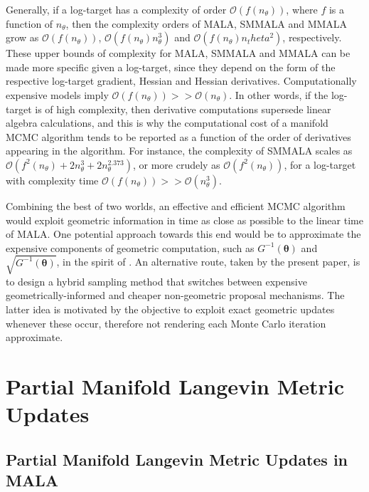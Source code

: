 \documentclass[twoside,11pt]{article}
\begin{document}
Generally, if a log-target has a complexity of order $\mathcal{O}(f(n_{\theta}))$, where $f$ is a function of $n_{\theta}$, 
then the complexity orders of MALA, SMMALA and MMALA grow as $\mathcal{O}(f(n_{\theta}))$, $\mathcal{O}(f(n_{\theta})n_\theta^3)$ 
and $\mathcal{O}(f(n_{\theta})n_theta^2)$, respectively. 
These upper bounds of complexity for MALA, SMMALA and MMALA can be made 
more specific given a log-target, since they depend on the form of the respective log-target gradient, Hessian and Hessian
derivatives. Computationally expensive models imply $\mathcal{O}(f(n_{\theta}))>>\mathcal{O}(n_{\theta})$. In other words, if the log-target is of high complexity, then
derivative computations supersede linear algebra calculations, and this is why the computational cost of a manifold MCMC
algorithm tends to be reported as a function of the order of derivatives appearing in the algorithm. For instance, the
complexity of SMMALA scales as $\mathcal{O}(f^2(n_{\theta})+2n_\theta^3+2n_\theta^{2.373})$, or more crudely as
$\mathcal{O}(f^2(n_{\theta}))$, for a log-target with complexity time
$\mathcal{O}(f(n_{\theta}))>>\mathcal{O}(n_{\theta}^3)$.

Combining the best of two worlds, an effective and efficient MCMC algorithm would exploit geometric information in time as 
close as possible to the linear time of MALA. One potential approach towards this end would be to approximate the expensive 
components of geometric computation, such as $G^{-1}(\boldsymbol{\theta})$ and $\sqrt{G^{-1}(\boldsymbol{\theta})}$, in the 
spirit of \cite{sim_bad_cem__sto}. An alternative route, taken by the present paper, is to design a hybrid sampling method 
that switches between expensive geometrically-informed and cheaper non-geometric proposal mechanisms. The latter idea is
motivated by the objective to exploit exact geometric updates whenever these occur, therefore not rendering each Monte Carlo 
iteration approximate.

\section{Partial Manifold Langevin Metric Updates}

\subsection{Partial Manifold Langevin Metric Updates in MALA}
\end{document}
